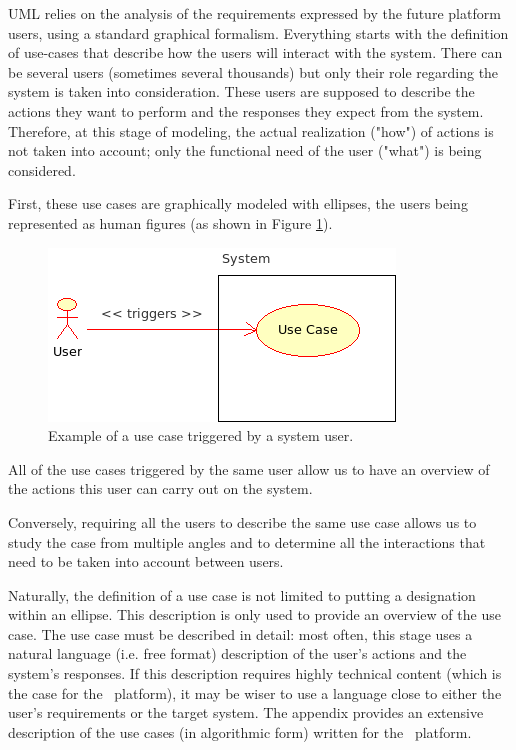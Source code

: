 UML relies on the analysis of the requirements expressed by the future platform users, using a standard graphical formalism. Everything starts with the definition of use-cases that describe how the users will interact with the system. There can be several users (sometimes several thousands) but only their role regarding the system is taken into consideration. These users are supposed to describe the actions they want to perform and the responses they expect from the system. Therefore, at this stage of modeling, the actual realization ("how") of actions is not taken into account; only the functional need of the user ("what") is being considered.

First, these use cases are graphically modeled with ellipses, the users being represented as human figures (as shown in Figure \ref{fig:usecase}).

\begin{figure}[htb]
  \begin{center}
    \includegraphics[scale=0.9]{Figures/analysis/usecase.png}
    \caption{Example of a use case triggered by a system user.}\label{fig:usecase}
  \end{center}
\end{figure}

All of the use cases triggered by the same user allow us to have an overview of the actions this user can carry out on the system.

Conversely, requiring all the users to describe the same use case allows us to study the case from multiple angles and to determine all the interactions that need to be taken into account between users.

Naturally, the definition of a use case is not limited to putting a designation within an ellipse. This description is only used to provide an overview of the use case. The use case must be described in detail: most often, this stage uses a natural language (i.e. free format) description of the user's actions and the system's responses. If this description requires highly technical content (which is the case for the \OT\ platform), it may be wiser to use a language close to either the user's requirements or the target system. The appendix provides an extensive description of the use cases (in algorithmic form) written for the \OT\ platform.


